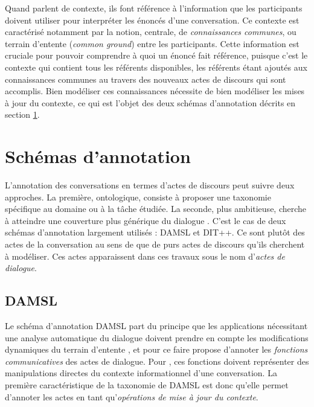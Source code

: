 \documentclass[10pt,a4paper,twoside]{article}
\begin{document}
Quand \citeauthor{poesio1997conversational} parlent de contexte, ils font référence à l'information que les participants doivent utiliser pour interpréter les énoncés d'une conversation. Ce contexte est caractérisé notamment par la notion, centrale, de \textit{connaissances communes}, ou \og terrain d'entente \fg{} (\textit{common ground}) entre les participants. Cette information est cruciale pour pouvoir comprendre à quoi un énoncé fait référence, puisque c'est le contexte qui contient tous les référents disponibles, les référents étant ajoutés aux connaissances communes au travers des nouveaux actes de discours qui sont accomplis. Bien modéliser ces connaissances nécessite de bien modéliser les mises à jour du contexte, ce qui est l'objet des deux schémas d'annotation décrits en section \ref{sec:annotation_schemes}.

\section{Schémas d'annotation}
\label{sec:annotation_schemes}

L'annotation des conversations en termes d'actes de discours peut suivre deux approches. La première, ontologique, consiste à proposer une taxonomie spécifique au domaine ou à la tâche étudiée. La seconde, plus ambitieuse, cherche à atteindre une couverture plus générique du dialogue \cite{leech2003generic}. C'est le cas de deux schémas d'annotation largement utilisés : DAMSL et DIT++. Ce sont plutôt des actes de la conversation au sens de \citeauthor{traum1992conversation} que de purs actes de discours qu'ils cherchent à modéliser. Ces actes apparaissent dans ces travaux sous le nom d'\textit{actes de dialogue}.

\subsection{DAMSL}
\label{subsec:DAMSL}

Le schéma d'annotation DAMSL part du principe que les applications nécessitant une analyse automatique du dialogue doivent prendre en compte les modifications dynamiques du \og terrain d'entente \fg, et pour ce faire propose d'annoter les \textit{fonctions communicatives} des actes de dialogue. Pour \citet{core1997coding}, ces fonctions doivent représenter des manipulations directes du contexte informationnel d'une conversation. La première caractéristique de la taxonomie de DAMSL est donc qu'elle permet d'annoter les actes en tant qu'\textit{opérations de mise à jour du contexte}.
\end{document}
